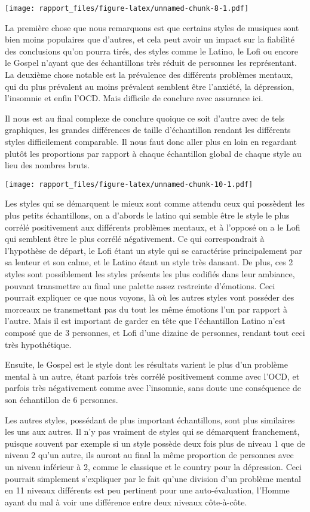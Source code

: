\documentclass[
]{article}
\begin{document}
\texttt{[image: rapport\_files/figure-latex/unnamed-chunk-8-1.pdf]}

La première chose que nous remarquons est que certains styles de
musiques sont bien moins populaires que d'autres, et cela peut avoir un
impact sur la fiabilité des conclusions qu'on pourra tirés, des styles
comme le Latino, le Lofi ou encore le Gospel n'ayant que des
échantillons très réduit de personnes les représentant. La deuxième
chose notable est la prévalence des différents problèmes mentaux, qui du
plus prévalent au moins prévalent semblent être l'anxiété, la
dépression, l'insomnie et enfin l'OCD. Mais difficile de conclure avec
assurance ici.

Il nous est au final complexe de conclure quoique ce soit d'autre avec
de tels graphiques, les grandes différences de taille d'échantillon
rendant les différents styles difficilement comparable. Il nous faut
donc aller plus en loin en regardant plutôt les proportions par rapport
à chaque échantillon global de chaque style au lieu des nombres bruts.

\texttt{[image: rapport\_files/figure-latex/unnamed-chunk-10-1.pdf]}

Les styles qui se démarquent le mieux sont comme attendu ceux qui
possèdent les plus petits échantillons, on a d'abords le latino qui
semble être le style le plus corrélé positivement aux différents
problèmes mentaux, et à l'opposé on a le Lofi qui semblent être le plus
corrélé négativement. Ce qui correspondrait à l'hypothèse de départ, le
Lofi étant un style qui se caractérise principalement par sa lenteur et
son calme, et le Latino étant un style très dansant. De plus, ces 2
styles sont possiblement les styles présents les plus codifiés dans leur
ambiance, pouvant transmettre au final une palette assez restreinte
d'émotions. Ceci pourrait expliquer ce que nous voyons, là où les autres
styles vont posséder des morceaux ne transmettant pas du tout les même
émotions l'un par rapport à l'autre. Mais il est important de garder en
tête que l'échantillon Latino n'est composé que de 3 personnes, et Lofi
d'une dizaine de personnes, rendant tout ceci très hypothétique.

Ensuite, le Gospel est le style dont les résultats varient le plus d'un
problème mental à un autre, étant parfois très corrélé positivement
comme avec l'OCD, et parfois très négativement comme avec l'insomnie,
sans doute une conséquence de son échantillon de 6 personnes.

Les autres styles, possédant de plus important échantillons, sont plus
similaires les uns aux autres. Il n'y pas vraiment de styles qui se
démarquent franchement, puisque souvent par exemple si un style possède
deux fois plus de niveau 1 que de niveau 2 qu'un autre, ils auront au
final la même proportion de personnes avec un niveau inférieur à 2,
comme le classique et le country pour la dépression. Ceci pourrait
simplement s'expliquer par le fait qu'une division d'un problème mental
en 11 niveaux différents est peu pertinent pour une auto-évaluation,
l'Homme ayant du mal à voir une différence entre deux niveaux
côte-à-côte.
\end{document}
